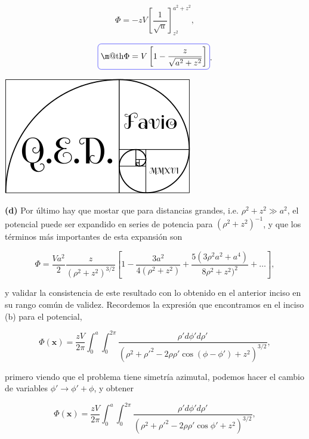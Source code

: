 \documentclass[a4paper,11pt]{article}
\makeatletter
\numberwithin{equation}{section}
\newcommand*{\boxcolor}{blue}
\renewcommand{\boxed}[1]{\textcolor{\boxcolor}{%
\tikz[baseline={([yshift=-1ex]current bounding box.center)}] \node [rectangle, minimum width=1ex,rounded corners,draw] {\normalcolor\m@th$\displaystyle#1$};}}
\makeatother
\begin{document}
\begin{equation}
 \Phi = - zV \left[\frac{1}{\sqrt{u}}\right]_{z^2}^{a^2+z^2},
\end{equation}

\begin{equation}
 \boxed{\Phi = V\left[1 - \frac{z}{\sqrt{a^2 + z^2}} \right]}.
\end{equation}

\hspace{10cm}\includegraphics[scale=0.2]{logoQED}

\vspace{.5cm}

\textbf{(d)} Por último hay que mostar que para distancias grandes, 
i.e. $\rho^2 + z^2 \gg a^2$, el potencial puede ser expandido en series 
de potencia para $(\rho^2 + z^2)^{-1}$, y que los términos más importantes 
de esta expansión son 

\begin{equation}
 \Phi = \frac{Va^2}{2}\frac{z}{(\rho^2 + z^2)^{3/2}}\left[1 - 
 \frac{3a^2}{4(\rho^2 + z^2)} + \frac{5(3\rho^2a^2+a^4)}{8\rho^2 + z^2)^2} 
 + \dots \right],
\end{equation}

y validar la consistencia de este resultado con lo obtenido en el anterior 
inciso en su rango común de validez. Recordemos la expresión que 
encontramos en el inciso (b) para el potencial, 

\begin{equation}
 \Phi(\mathbf{x}) = \frac{zV}{2\pi}\int_0^a\int_0^{2\pi} 
 \frac{\rho' d\phi' d\rho'}{(\rho^2 + \rho'^2 - 2\rho\rho'\cos{(\phi - \phi')} + 
 z^2)^{3/2}},
\end{equation}

primero viendo que el problema tiene simetría azimutal, podemos hacer 
el cambio de variables $\phi' \rightarrow \phi' + \phi$, y obtener 

\begin{equation}
 \Phi(\mathbf{x}) = \frac{zV}{2\pi}\int_0^a\int_0^{2\pi} 
 \frac{\rho' d\phi' d\rho'}{(\rho^2 + \rho'^2 - 2\rho\rho'\cos{\phi'} + 
 z^2)^{3/2}},
\end{equation}
\end{document}

